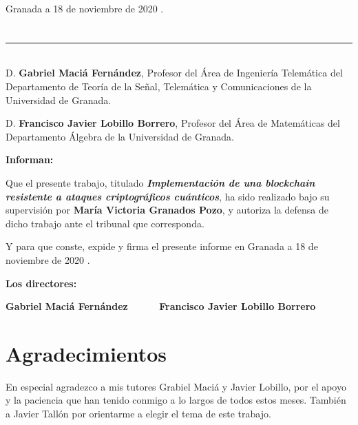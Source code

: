 \begin{flushright}
Granada a 18 de noviembre de 2020 .
\end{flushright}


\chapter*{}
\thispagestyle{empty}

\noindent\rule[-1ex]{\textwidth}{2pt}\\[4.5ex]

D. \textbf{Gabriel Maciá Fernández}, Profesor del Área de Ingeniería Telemática del Departamento de Teoría de la Señal, Telemática y Comunicaciones de la Universidad de Granada.

\vspace{0.5cm}

D. \textbf{Francisco Javier Lobillo Borrero}, Profesor del Área de Matemáticas del Departamento Álgebra de la Universidad de Granada.


\vspace{0.5cm}

\textbf{Informan:}

\vspace{0.5cm}

Que el presente trabajo, titulado \textit{\textbf{ Implementación de una blockchain resistente a ataques criptográficos cuánticos}},
ha sido realizado bajo su supervisión por \textbf{María Victoria Granados Pozo}, y autoriza la defensa de dicho trabajo ante el tribunal
que corresponda.

\vspace{0.5cm}

Y para que conste, expide y firma el presente informe en Granada a 18 de noviembre de 2020 .

\vspace{1cm}

\textbf{Los directores:}

\vspace{5cm}

\noindent \textbf{Gabriel Maciá Fernández \ \ \ \ \ Francisco Javier Lobillo Borrero}

\chapter*{Agradecimientos}
\thispagestyle{empty}

       \vspace{1cm}


En especial agradezco a mis tutores Grabiel Maciá y Javier Lobillo, por el apoyo y la paciencia que han tenido conmigo a lo largos de todos estos meses. También a Javier Tallón por orientarme a elegir el tema de este trabajo.\\

